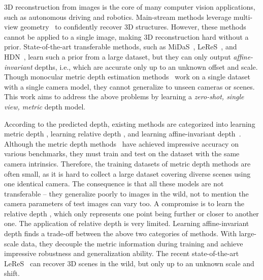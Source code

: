 


3D reconstruction from images is the core of many computer vision applications, such as autonomous driving and robotics. Main-stream methods leverage multi-view %
geometry~\cite{hartley2003multiple} to confidently recover 3D structures. However, these methods cannot be applied to a single image, making 3D reconstruction hard without a prior. 
State-of-the-art transferable methods, such as MiDaS~\cite{Ranftl2020}, LeReS~\cite{leres}, and HDN~\cite{zhang2022hierarchical}, learn such a prior from a large dataset, but they can only output \emph{affine-invariant} depths, i.e., which are accurate only up to an unknown offset and scale. Though monocular metric depth estimation methods~\cite{yuan2022new, bhat2021adabins} work on a single dataset with a single camera model, they cannot generalize to unseen cameras or scenes. 
This work aims to address the above problems by learning a \emph{zero-shot, single view, metric} depth model. 

 


According to the predicted depth, 
existing methods are categorized into learning metric depth \cite{yuan2022new, yin2021virtual, bhat2021adabins, yang2021transformers}, learning relative depth \cite{xian2018monocular, xian2020structure, chen2020oasis, chen2016single}, and learning affine-invariant depth~\cite{leres, yin2022towards, Ranftl2020, ranftl2021vision, zhang2022hierarchical}. Although the metric depth methods~\cite{yuan2022new, yin2021virtual, Yin2019enforcing, bhat2021adabins, yang2021transformers} have achieved impressive accuracy on various benchmarks, they must train and test on the dataset with the same camera intrinsics. %
Therefore, the training datasets of metric depth methods are often small, as it is hard to collect a large dataset covering diverse scenes using one identical camera. The consequence is that 
all these models are not transferable -- they generalize poorly to images in the wild, not to mention the camera parameters of test images can vary too.
A compromise is to learn the relative depth
\cite{chen2020oasis, xian2018monocular}, which only represents
one point being further or closer to another one. %
The application of relative depth is very limited.
Learning affine-invariant depth 
finds a trade-off between the above two categories of methods. 
With large-scale data, they decouple the metric information during training and achieve impressive robustness and generalization ability. The recent state-of-the-art LeReS~\cite{leres} can recover 3D scenes in the wild, 
but only up to an unknown scale and shift. 

